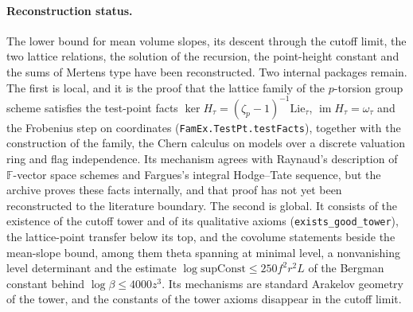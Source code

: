 \documentclass[11pt,letterpaper]{article}
\numberwithin{equation}{section}
\begin{document}
\paragraph{Reconstruction status.} The lower bound for mean volume slopes, its descent through the cutoff limit, the two lattice relations, the solution of the recursion, the point-height constant and the sums of Mertens type have been reconstructed. Two internal packages remain. The first is local, and it is the proof that the lattice family of the $p$-torsion group scheme satisfies the test-point facts $\ker H_\tau=(\zeta_p-1)^{-1}\mathrm{Lie}_\tau$, $\operatorname{im}H_\tau=\omega_\tau$ and the Frobenius step on coordinates (\texttt{FamEx.TestPt.testFacts}), together with the construction of the family, the Chern calculus on models over a discrete valuation ring and flag independence. Its mechanism agrees with Raynaud's description of $\mathbb F$-vector space schemes and Fargues's integral Hodge--Tate sequence, but the archive proves these facts internally, and that proof has not yet been reconstructed to the literature boundary. The second is global. It consists of the existence of the cutoff tower and of its qualitative axioms (\texttt{exists\_good\_tower}), the lattice-point transfer below its top, and the covolume statements beside the mean-slope bound, among them theta spanning at minimal level, a nonvanishing level determinant and the estimate $\log\mathrm{supConst}\le250f^2r^2L$ of the Bergman constant behind $\log\beta\le4000z^3$. Its mechanisms are standard Arakelov geometry of the tower, and the constants of the tower axioms disappear in the cutoff limit.
\end{document}
